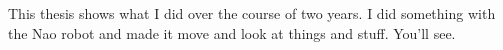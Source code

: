 {}
{
	This thesis shows what I did over the course of two years. I did something with the Nao robot and made it move and look at things and stuff.
	You'll see.
\clearpage}
{\endmsabstract}